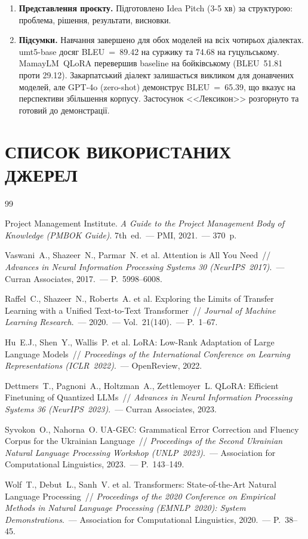 \documentclass[14pt]{extarticle}
\begin{document}
\begin{enumerate}
  \item \textbf{Представлення проєкту.} Підготовлено Idea Pitch (3-5 хв) за структурою: проблема, рішення, результати, висновки.

  \item \textbf{Підсумки.} Навчання завершено для обох моделей на всіх чотирьох діалектах. umt5-base досяг BLEU~=~89.42 на суржику та 74.68 на гуцульському. MamayLM~QLoRA перевершив baseline на бойківському (BLEU~51.81 проти 29.12). Закарпатський діалект залишається викликом для донавчених моделей, але GPT-4o (zero-shot) демонструє BLEU~=~65.39, що вказує на перспективи збільшення корпусу. Застосунок <<Лексикон>> розгорнуто та готовий до демонстрації.
\end{enumerate}

\clearpage

\section*{СПИСОК ВИКОРИСТАНИХ ДЖЕРЕЛ}

\begin{thebibliography}{99}

Project Management Institute.
\textit{A Guide to the Project Management Body of Knowledge (PMBOK Guide)}.
7th~ed.~--- PMI, 2021.~--- 370~p.

Vaswani~A., Shazeer~N., Parmar~N. et al.
Attention is All You Need~//
\textit{Advances in Neural Information Processing Systems 30 (NeurIPS~2017)}.~---
Curran Associates, 2017.~--- P.~5998--6008.

Raffel~C., Shazeer~N., Roberts~A. et al.
Exploring the Limits of Transfer Learning with a Unified Text-to-Text Transformer~//
\textit{Journal of Machine Learning Research}.~--- 2020.~--- Vol.~21(140).~--- P.~1--67.

Hu~E.J., Shen~Y., Wallis~P. et al.
LoRA: Low-Rank Adaptation of Large Language Models~//
\textit{Proceedings of the International Conference on Learning Representations (ICLR~2022)}.~---
OpenReview, 2022.

Dettmers~T., Pagnoni~A., Holtzman~A., Zettlemoyer~L.
QLoRA: Efficient Finetuning of Quantized LLMs~//
\textit{Advances in Neural Information Processing Systems 36 (NeurIPS~2023)}.~---
Curran Associates, 2023.

Syvokon~O., Nahorna~O.
UA-GEC: Grammatical Error Correction and Fluency Corpus for the Ukrainian Language~//
\textit{Proceedings of the Second Ukrainian Natural Language Processing Workshop (UNLP~2023)}.~---
Association for Computational Linguistics, 2023.~--- P.~143--149.

Wolf~T., Debut~L., Sanh~V. et al.
Transformers: State-of-the-Art Natural Language Processing~//
\textit{Proceedings of the 2020 Conference on Empirical Methods in Natural Language Processing (EMNLP~2020): System Demonstrations}.~---
Association for Computational Linguistics, 2020.~--- P.~38--45.

\end{thebibliography}
\end{document}
